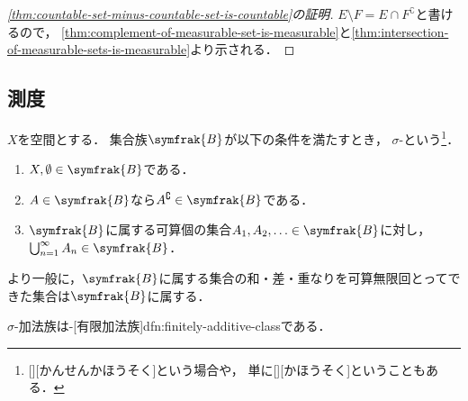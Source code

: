 \documentclass[../sotsu.tex]{subfiles}
\begin{document}
\begin{proof}[\cref{thm:countable-set-minus-countable-set-is-countable}の証明]
    $E \setminus F = E \cap F^{\complement}$と書けるので，
    \cref{thm:complement-of-measurable-set-is-measurable}と\cref{thm:intersection-of-measurable-sets-is-measurable}より示される．
\end{proof}



\subsection{測度}

\begin{definition}
    \label{dfn:sigma-additive-class}
    $X$を空間とする．
    集合族$\symfrak{B}$が以下の条件を満たすとき，
    $\sigma$-という\footnote{
        [][かんせんかほうそく]という場合や，
        単に[][かほうそく]ということもある．
    }．
    \begin{enumerate}
        \item $X, \emptyset \in \symfrak{B}$である．
        \item $A \in \symfrak{B}$なら$A^{\complement} \in \symfrak{B}$である．
        \item $\symfrak{B}$に属する可算個の集合$A_1, A_2, \dotsc \in \symfrak{B}$に対し，
            \(  \bigcup_{n=1}^{\infty} A_n  \in  \symfrak{B}  \)．
    \end{enumerate}
    より一般に，$\symfrak{B}$に属する集合の和・差・重なりを可算無限回とってできた集合は$\symfrak{B}$に属する．
\end{definition}

$\sigma$-加法族は-[有限加法族]{dfn:finitely-additive-class}である．
\end{document}
